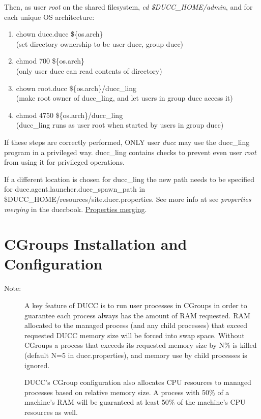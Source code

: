      Then, as user {\em root} on the shared filesystem, {\em cd \$DUCC\_HOME/admin}, and for each unique OS architecture:
     \begin{enumerate}
        \item chown ducc.ducc \$\{os.arch\}
        \\ (set directory ownership to be user ducc, group ducc)
        \item chmod 700 \$\{os.arch\}
        \\ (only user ducc can read contents of directory)
        \item chown root.ducc \$\{os.arch\}/ducc\_ling
        \\ (make root owner of ducc\_ling, and let users in group ducc access it)
        \item chmod 4750 \$\{os.arch\}/ducc\_ling
        \\ (ducc\_ling runs as user root when started by users in group ducc)
     \end{enumerate}
          
If these steps are correctly performed, ONLY user {\em ducc} may use the ducc\_ling program in
a privileged way. ducc\_ling contains checks to prevent even user {\em root} from using it for
privileged operations.

If a different location is chosen for ducc\_ling the new path needs to be specified 
for ducc.agent.launcher.ducc\_spawn\_path in \$DUCC\_HOME/resources/site.ducc.properties.
See more info at see 
\ifdefined\DUCCSTANDALONE
{\em properties merging} in the duccbook. 
\else
\hyperref[sec:admin.properties-merge] {Properties merging}. 
\fi


\section{CGroups Installation and Configuration}

\begin{description}
    \item[Note:] A key feature of DUCC is to run user processes in CGroups in order to guarantee
      each process always has the amount of RAM requested. RAM allocated to the managed process
      (and any child processes) that exceed requested DUCC memory size will be forced into swap space. 
      Without CGroups a process that exceeds its requested memory size by N\% is killed 
      (default N=5 in ducc.properties), and memory use by child processes is ignored.
      
      DUCC's CGroup configuration also allocates CPU resources to managed processes based on
      relative memory size. A process with 50\% of a machine's RAM will be guaranteed at least
      50\% of the machine's CPU resources as well. 
\end{description}

